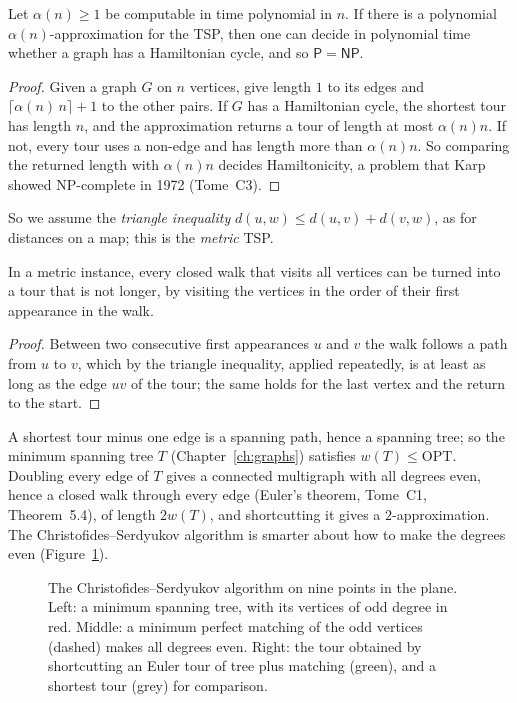\begin{proposition}\label{prop:tsphard}
Let $\alpha(n)\ge1$ be computable in time polynomial in $n$. If there is a polynomial $\alpha(n)$-approximation for the TSP, then one can decide in polynomial time whether a graph has a Hamiltonian cycle, and so $\mathsf P=\mathsf{NP}$.
\end{proposition}
\begin{proof}
Given a graph $G$ on $n$ vertices, give length $1$ to its edges and $\lceil\alpha(n)\,n\rceil+1$ to the other pairs. If $G$ has a Hamiltonian cycle, the shortest tour has length $n$, and the approximation returns a tour of length at most $\alpha(n)n$. If not, every tour uses a non-edge and has length more than $\alpha(n)n$. So comparing the returned length with $\alpha(n)n$ decides Hamiltonicity, a problem that Karp showed NP-complete in 1972 (Tome~C3).
\end{proof}

So we assume the \emph{triangle inequality} $d(u,w)\le d(u,v)+d(v,w)$, as for distances on a map; this is the \emph{metric} TSP.

\begin{lemma}[shortcutting]\label{lem:shortcut}
In a metric instance, every closed walk that visits all vertices can be turned into a tour that is not longer, by visiting the vertices in the order of their first appearance in the walk.
\end{lemma}
\begin{proof}
Between two consecutive first appearances $u$ and $v$ the walk follows a path from $u$ to $v$, which by the triangle inequality, applied repeatedly, is at least as long as the edge $uv$ of the tour; the same holds for the last vertex and the return to the start.
\end{proof}

A shortest tour minus one edge is a spanning path, hence a spanning tree; so the minimum spanning tree $T$ (Chapter~\ref{ch:graphs}) satisfies $w(T)\le\mathrm{OPT}$. Doubling every edge of $T$ gives a connected multigraph with all degrees even, hence a closed walk through every edge (Euler's theorem, Tome~C1, Theorem~5.4), of length $2w(T)$, and shortcutting it gives a $2$-approximation. The Christofides--Serdyukov algorithm is smarter about how to make the degrees even (Figure~\ref{fig:christofides}).

\begin{figure}[ht]
\centering
{}
\caption{The Christofides--Serdyukov algorithm on nine points in the plane. Left: a minimum spanning tree, with its vertices of odd degree in red. Middle: a minimum perfect matching of the odd vertices (dashed) makes all degrees even. Right: the tour obtained by shortcutting an Euler tour of tree plus matching (green), and a shortest tour (grey) for comparison.}
\label{fig:christofides}
\end{figure}

